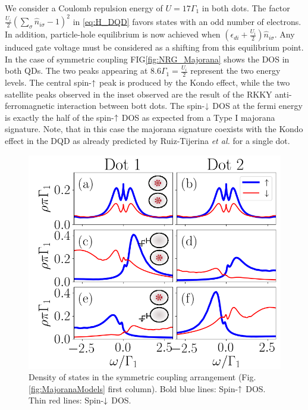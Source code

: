 \documentclass[showpacs,aps,prb,reprint,superscriptaddress]{revtex4-1}
\begin{document}
    
    We consider a Coulomb repulsion energy of $U = 17\Gamma_1$ in both dots. The factor $ \frac{U_i}{2}(\sum_{\sigma} \hat{n}_{i\sigma}-1)^{2}$ in \eqref{eq:H_DQD} favors states with an odd number of electrons. In addition, particle-hole equilibrium is now achieved when $\left(\epsilon_{di}+\frac{U_i}{2}\right)\hat{n}_{i\sigma}$. Any induced gate voltage must be considered as a shifting from this equilibrium point. In the case of symmetric coupling FIG\ref{fig:NRG_Majorana} shows the DOS in both QDs. The two peaks appearing at $8.6\Gamma_1 = \frac{U_i}{2}$ represent the two energy levels. The central spin-$\uparrow$ peak is produced by the Kondo effect, \cite{hewson_kondo_1997,wilson_renormalization_1975}  while the two satellite peaks observed in the inset observed are the result of the  RKKY anti-ferromagnetic interaction between bott dots.  \cite{ruderman_indirect_1954,kasuya_theory_1956,yosida_magnetic_1957} The spin-$\downarrow$ DOS at the fermi energy  is exactly the half of the spin-$\uparrow$ DOS as expected from a Type I majorana signature. Note, that in this case the majorana signature coexists with the Kondo effect in the DQD as already predicted by Ruiz-Tijerina \textit{et al.} for a single dot. \cite{ruiz-tijerina_interaction_2015}
    






 



\begin{figure}[bt]
\begin{center}
\includegraphics[scale=0.45]{Graficos/Nt1=t2.png}
\caption{ \label{fig:t1=t2}  Density of states in the symmetric coupling arrangement (Fig.\ref{fig:MajoranaModels} first column). Bold blue lines: Spin-$\uparrow$ DOS. Thin red lines: Spin-$\downarrow$ DOS.  
}
%
\end{center}
\end{figure}
\end{document}
